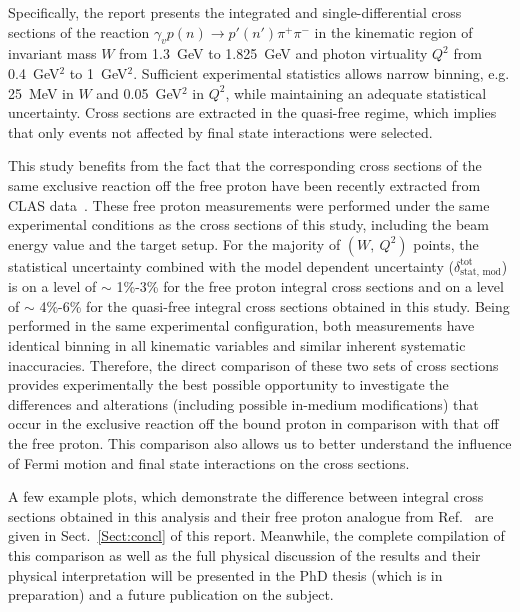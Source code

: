 Specifically, the report presents the integrated and single-differential cross sections of the reaction $\gamma_{v}p(n) \rightarrow p' (n')\pi^{+}\pi^{-}$ in the kinematic region of invariant mass $W$ from 1.3~GeV to 1.825~GeV and photon virtuality $Q^{2}$ from 0.4~GeV$^2$ to 1~GeV$^2$. Sufficient experimental statistics allows narrow binning, e.g. 25~MeV in $W$ and 0.05~GeV$^2$ in $Q^2$, while maintaining an adequate statistical uncertainty. Cross sections are extracted in the quasi-free regime, which implies that only events not affected by final state interactions were selected.

This study benefits from the fact that the corresponding cross sections of the same exclusive reaction off the free proton have been recently extracted from CLAS data~\cite{Fed_an_note:2017,Fed_paper_2018}. These free proton measurements were performed under the same experimental conditions as the cross sections of this study, including the beam energy value and the target setup. For the majority of $(W,~Q^{2})$ points, the statistical uncertainty combined with the model dependent uncertainty ($\delta_{\text{stat,~mod}}^{\text{tot}}$) is on a level of $\sim$ 1\%-3\% for the free proton integral cross sections and on a level of $\sim$ 4\%-6\% for the quasi-free integral cross sections obtained in this study. Being performed in the same experimental configuration, both measurements have identical binning in all kinematic variables and similar inherent systematic inaccuracies. Therefore, the direct comparison of these two sets of cross sections provides experimentally the best possible opportunity to investigate the differences and alterations (including possible in-medium modifications) that occur in the exclusive reaction off the bound proton in comparison with that off the free proton. This comparison also allows us to better understand the influence of Fermi motion and final state interactions on the cross sections.



A few example plots, which demonstrate the difference between integral cross sections obtained in this analysis and their free proton analogue from Ref.~\cite{Fed_an_note:2017,Fed_paper_2018} are given in Sect.~\ref{Sect:concl} of this report. Meanwhile, the complete compilation of this comparison as well as the full physical discussion of the results and their physical interpretation will be presented in the PhD thesis (which is in preparation) and a future publication on the subject.





